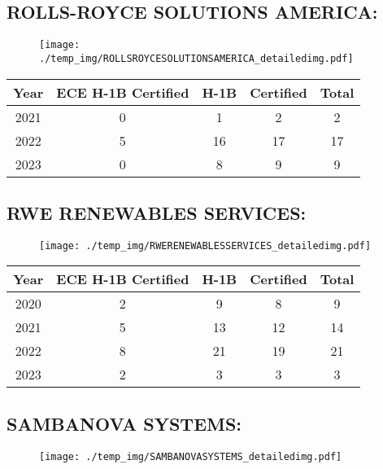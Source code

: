 \documentclass{article}%
\begin{document}
%
\newpage%
\subsection{ROLLS{-}ROYCE SOLUTIONS AMERICA:}%
\label{subsec:ROLLS{-}ROYCESOLUTIONSAMERICA}%
\label{ROLLSROYCESOLUTIONSAMERICAdetailed}%


\begin{figure}[htbp]%
\centering%
\texttt{[image: ./temp\_img/ROLLSROYCESOLUTIONSAMERICA\_detailedimg.pdf]}%
\end{figure}

%
\begin{longtable}{c|c|c|c|c}%
\hline%
Year&ECE H{-}1B Certified&H{-}1B&Certified&Total\\%
\hline%
2021&0&1&2&2\\%
\hline%
2022&5&16&17&17\\%
\hline%
2023&0&8&9&9\\%
\hline%
\end{longtable}

%
\newpage%
\subsection{RWE RENEWABLES SERVICES:}%
\label{subsec:RWERENEWABLESSERVICES}%
\label{RWERENEWABLESSERVICESdetailed}%


\begin{figure}[htbp]%
\centering%
\texttt{[image: ./temp\_img/RWERENEWABLESSERVICES\_detailedimg.pdf]}%
\end{figure}

%
\begin{longtable}{c|c|c|c|c}%
\hline%
Year&ECE H{-}1B Certified&H{-}1B&Certified&Total\\%
\hline%
2020&2&9&8&9\\%
\hline%
2021&5&13&12&14\\%
\hline%
2022&8&21&19&21\\%
\hline%
2023&2&3&3&3\\%
\hline%
\end{longtable}

%
\newpage%
\subsection{SAMBANOVA SYSTEMS:}%
\label{subsec:SAMBANOVASYSTEMS}%
\label{SAMBANOVASYSTEMSdetailed}%


\begin{figure}[htbp]%
\centering%
\texttt{[image: ./temp\_img/SAMBANOVASYSTEMS\_detailedimg.pdf]}%
\end{figure}
\end{document}
